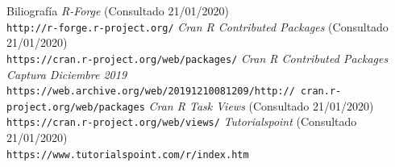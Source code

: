 \documentclass[xcolor=table]{beamer}
\begin{document}
\begin{frame}{Biliografía}
\textit{R-Forge} (Consultado 21/01/2020)
\\\texttt{http://r-forge.r-project.org/}
\newline
\newline
\textit{Cran R Contributed Packages} (Consultado 21/01/2020)
\\\texttt{https://cran.r-project.org/web/packages/}
\newline
\newline
\textit{Cran R Contributed Packages Captura Diciembre 2019}
\\\texttt{https://web.archive.org/web/20191210081209/http://
cran.r-project.org/web/packages}
\newline
\newline
\textit{Cran R Task Views} (Consultado 21/01/2020)
\\\texttt{https://cran.r-project.org/web/views/}
\newline
\newline
\textit{Tutorialspoint} (Consultado 21/01/2020)
\\\texttt{https://www.tutorialspoint.com/r/index.htm}
\end{frame}
\end{document}

